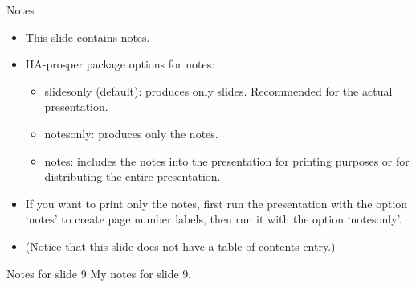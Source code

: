 \documentclass[pdf]{prosper}
\begin{document}
\begin{slide}[toc=]{Notes}
\begin{itemize}
\item This slide contains notes.
\item HA-prosper package options for notes:
\begin{itemize}
\item slidesonly (default): produces only slides. Recommended for the
actual presentation.
\item notesonly: produces only the notes.
\item notes: includes the notes into the presentation for printing
purposes or for distributing the entire presentation.
\end{itemize}
\item If you want to print only the notes, first run the presentation
with the option `notes' to create page number labels, then run it with
the option `notesonly'.
\item (Notice that this slide does not have a table of contents entry.)
\end{itemize}
\end{slide}


\begin{notes}{Notes for slide 9}
My notes for slide 9.
\end{notes}


\end{document}
